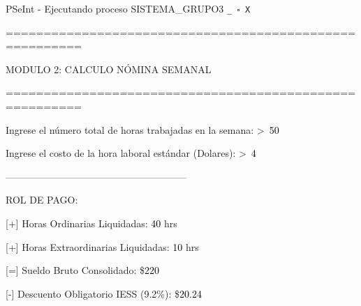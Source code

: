\documentclass[12pt,a4paper]{article}
\newcommand{\consola}[1]{\noindent\textcolor{pseString}{#1}}
\newcommand{\entrada}[1]{\textcolor{black}{#1}}
\newenvironment{PSeIntWindow}{%
	\begin{tcolorbox}[
		breakable,
		enhanced,
		colback=white,
		colframe=black!60,
		boxrule=0.5pt,
		arc=1mm,
		left=0mm,
		right=0mm,
		top=0mm,
		bottom=2mm,
		width=\textwidth
		]
	}{%
	\end{tcolorbox}
}
\newcommand{\BarraPSeInt}{%
	\colorbox{gray!20}{%
		\parbox{\dimexpr\textwidth-2\fboxsep\relax}{%
			\small
			\textcolor{pseString}{\faPlayCircle}
			\hspace{0.3em}
			PSeInt - Ejecutando proceso SISTEMA\_GRUPO3
			\hfill
			\texttt{\_ \hspace{0.5em} \(\square\) \hspace{0.5em} X}
		}
	}
}
\begin{document}
\begin{PSeIntWindow}
	
	\BarraPSeInt
	
	\vspace{0.2cm}
	
	\ttfamily
	\small
	
	\consola{========================================================}\par
	
	\begin{center}
		\textcolor{pseString}{MODULO 2: CALCULO NÓMINA SEMANAL}
	\end{center}
	
	\consola{========================================================}\par
	
	\vspace{0.3cm}
	
	\consola{Ingrese el número total de horas trabajadas en la semana: \textgreater\ }\entrada{50}\par
	
	\consola{Ingrese el costo de la hora laboral estándar (Dolares): \textgreater\ }\entrada{4}\par
	
	\vspace{0.3cm}
	
	\consola{--------------------------------------------------------}\par
	
	\vspace{0.2cm}
	
	\consola{ROL DE PAGO:}\par
	
	\vspace{0.2cm}
	
	\consola{\hspace*{0.5cm}[+] Horas Ordinarias Liquidadas: }\entrada{40}\consola{ hrs}\par
	
	\consola{\hspace*{0.5cm}[+] Horas Extraordinarias Liquidadas: }\entrada{10}\consola{ hrs}\par
	
	\consola{\hspace*{0.5cm}[=] Sueldo Bruto Consolidado: \$}\entrada{220}\par
	
	\consola{\hspace*{0.5cm}[-] Descuento Obligatorio IESS (9.2\%): \$}\entrada{20.24}\par
	

\end{PSeIntWindow}
\end{document}
